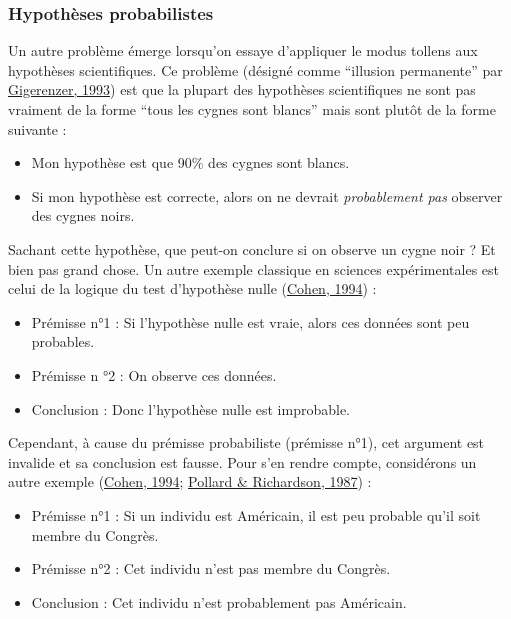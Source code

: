 \documentclass[
  a4paper,11pt,twoside,onecolumn,openright,final,oldfontcommands]{memoir}
\theoremstyle{definition}
\theoremstyle{definition}
\theoremstyle{definition}
\theoremstyle{remark}
\begin{document}
\hypertarget{hypothuxe8ses-probabilistes}{%
\subsubsection{Hypothèses probabilistes}\label{hypothuxe8ses-probabilistes}}

Un autre problème émerge lorsqu'on essaye d'appliquer le modus tollens aux hypothèses scientifiques. Ce problème (désigné comme {``illusion permanente''} par \protect\hyperlink{ref-gigerenzer_superego_1993}{Gigerenzer, 1993}) est que la plupart des hypothèses scientifiques ne sont pas vraiment de la forme ``tous les cygnes sont blancs'' mais sont plutôt de la forme suivante :

\begin{itemize}
\item
  Mon hypothèse est que 90\% des cygnes sont blancs.
\item
  Si mon hypothèse est correcte, alors on ne devrait \emph{probablement pas} observer des cygnes noirs.
\end{itemize}

Sachant cette hypothèse, que peut-on conclure si on observe un cygne noir ? Et bien pas grand chose. Un autre exemple classique en sciences expérimentales est celui de la logique du test d'hypothèse nulle (\protect\hyperlink{ref-cohen_earth_1994}{Cohen, 1994}) :

\begin{itemize}
\item
  Prémisse n°1 : Si l'hypothèse nulle est vraie, alors ces données sont peu probables.
\item
  Prémisse n °2 : On observe ces données.
\item
  Conclusion : Donc l'hypothèse nulle est improbable.
\end{itemize}

Cependant, à cause du prémisse probabiliste (prémisse n°1), cet argument est invalide et sa conclusion est fausse. Pour s'en rendre compte, considérons un autre exemple (\protect\hyperlink{ref-cohen_earth_1994}{Cohen, 1994}; \protect\hyperlink{ref-pollard_probability_1987}{Pollard \& Richardson, 1987}) :

\begin{itemize}
\item
  Prémisse n°1 : Si un individu est Américain, il est peu probable qu'il soit membre du Congrès.
\item
  Prémisse n°2 : Cet individu n'est pas membre du Congrès.
\item
  Conclusion : Cet individu n'est probablement pas Américain.
\end{itemize}
\end{document}
